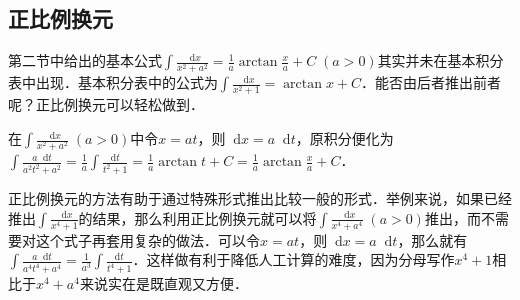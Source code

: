 \documentclass{ctexbook}
\newcommand*{\dif}{\mathop{}\!\mathrm{d}}
\begin{document}
\subsection{正比例换元}
第二节中给出的基本公式$\int\frac{\dif{x}}{x^{2}+a^{2}}=\frac{1}{a}\arctan{\frac{x}{a}}+C\;\left(a>0\right)$其实并未在基本积分表中出现．基本积分表中的公式为$\int\frac{\dif{x}}{x^{2}+1}=\arctan{x}+C$．能否由后者推出前者呢？正比例换元可以轻松做到．\par
在$\int\frac{\dif{x}}{x^{2}+a^{2}}\;\left(a>0\right)$中令$x=at$，则$\dif{x}=a\dif{t}$，原积分便化为$\int\frac{a\dif{t}}{a^{2}t^{2}+a^{2}}=\frac{1}{a}\int\frac{\mathrm{d}t}{t^{2}+1}=\frac{1}{a}\arctan{t}+C=\frac{1}{a}\arctan{\frac{x}{a}}+C$．\par
正比例换元的方法有助于通过特殊形式推出比较一般的形式．举例来说，如果已经推出$\int\frac{\dif{x}}{x^{4}+1}$的结果，那么利用正比例换元就可以将$\int\frac{\dif{x}}{x^{4}+a^{4}}\;\left(a>0\right)$推出，而不需要对这个式子再套用复杂的做法．可以令$x=at$，则$\dif{x}=a\dif{t}$，那么就有$\int\frac{a\dif{t}}{a^{4}t^{4}+a^{4}}=\frac{1}{a^{3}}\int\frac{\mathrm{d}t}{t^{4}+1}$．这样做有利于降低人工计算的难度，因为分母写作$x^{4}+1$相比于$x^{4}+a^{4}$来说实在是既直观又方便．\par
\end{document}
